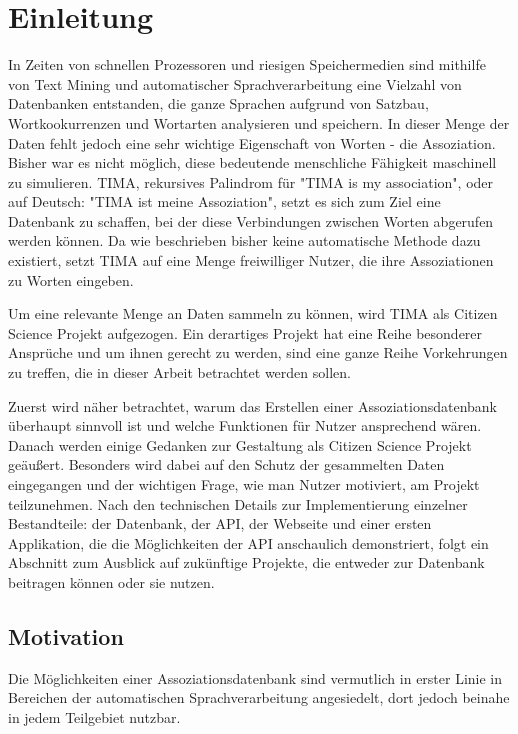 \chapter{Einleitung}

In Zeiten von schnellen Prozessoren und riesigen Speichermedien sind mithilfe von Text Mining und automatischer Sprachverarbeitung eine Vielzahl von Datenbanken entstanden, die ganze Sprachen aufgrund von Satzbau, Wortkookurrenzen und Wortarten analysieren und speichern. In dieser Menge der Daten fehlt jedoch eine sehr wichtige Eigenschaft von Worten - die Assoziation. Bisher war es nicht möglich, diese bedeutende menschliche Fähigkeit maschinell zu simulieren. TIMA, rekursives Palindrom für "TIMA is my association", oder auf Deutsch: "TIMA ist meine Assoziation", setzt es sich zum Ziel eine Datenbank zu schaffen, bei der diese Verbindungen zwischen Worten abgerufen werden können. Da wie beschrieben bisher keine automatische Methode dazu existiert, setzt TIMA auf eine Menge freiwilliger Nutzer, die ihre Assoziationen zu Worten eingeben.

Um eine relevante Menge an Daten sammeln zu können, wird TIMA als Citizen Science Projekt aufgezogen. Ein derartiges Projekt hat eine Reihe besonderer Ansprüche und um ihnen gerecht zu werden, sind eine ganze Reihe Vorkehrungen zu treffen, die in dieser Arbeit betrachtet werden sollen.

Zuerst wird näher betrachtet, warum das Erstellen einer Assoziationsdatenbank überhaupt sinnvoll ist und welche Funktionen für Nutzer ansprechend wären. Danach werden einige Gedanken zur Gestaltung  als Citizen Science Projekt geäußert. Besonders wird dabei auf den Schutz der gesammelten Daten eingegangen und der wichtigen Frage, wie man Nutzer motiviert, am Projekt teilzunehmen. Nach den technischen Details zur Implementierung einzelner Bestandteile: der Datenbank, der API, der Webseite und einer ersten Applikation, die die Möglichkeiten der API anschaulich demonstriert, folgt ein Abschnitt zum Ausblick auf zukünftige Projekte, die entweder zur Datenbank beitragen können oder sie nutzen.


\section{Motivation}
Die Möglichkeiten einer Assoziationsdatenbank sind vermutlich in erster Linie in Bereichen der automatischen Sprachverarbeitung angesiedelt, dort jedoch beinahe in jedem Teilgebiet nutzbar.

